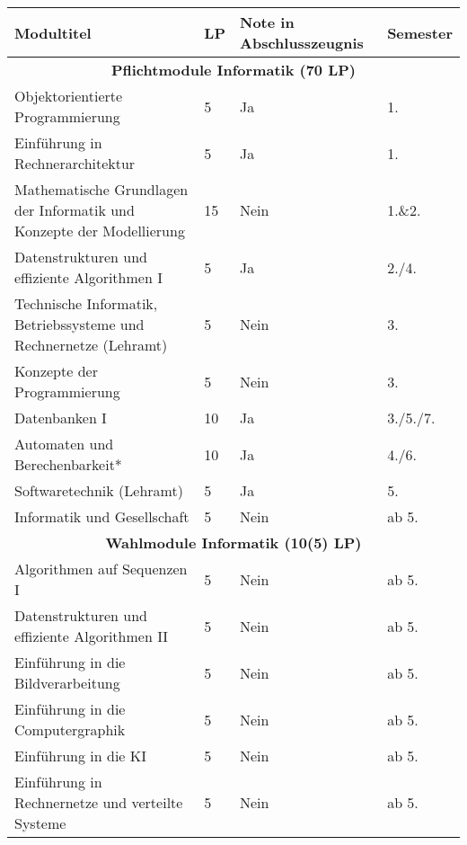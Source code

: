 \begin{table}[tbp]
	\begin{small}
		\begin{tabularx}{\textwidth}{|b{}|X|X|l|}
			\hline
			\textbf{Modultitel}                                                            & \textbf{LP} & \textbf{Note in Abschlusszeugnis} & \textbf{Semester} \\
			\hline
			\multicolumn{4}{|c|}{\textbf{Pflichtmodule Informatik (70 LP)}}\\\hline
			Objektorientierte Programmierung                                      &  5 & Ja   & 1. \\
			Einführung in Rechnerarchitektur                                      &  5 & Ja   & 1. \\
			Mathematische Grundlagen der Informatik und Konzepte der Modellierung & 15 & Nein & 1.\&2. \\
			Datenstrukturen und effiziente Algorithmen I                          &  5 & Ja   & 2./4. \\
			Technische Informatik, Betriebssysteme und Rechnernetze (Lehramt)     &  5 & Nein & 3. \\
			Konzepte der Programmierung                                           &  5 & Nein & 3. \\
			Datenbanken I                                                         & 10 & Ja   & 3./5./7. \\
			Automaten und Berechenbarkeit*                                        & 10 & Ja   & 4./6. \\
			Softwaretechnik (Lehramt)                                             &  5 & Ja   & 5. \\
			Informatik und Gesellschaft                                           &  5 & Nein & ab 5. \\
			\hline
			\multicolumn{4}{|c|}{\textbf{Wahlmodule Informatik (10(5) LP)}}\\\hline
			Algorithmen auf Sequenzen I                      & 5 & Nein & ab 5. \\
			Datenstrukturen und effiziente Algorithmen II    & 5 & Nein & ab 5. \\
			Einführung in die Bildverarbeitung               & 5 & Nein & ab 5. \\
			Einführung in die Computergraphik                & 5 & Nein & ab 5. \\
			Einführung in die KI                             & 5 & Nein & ab 5. \\
			Einführung in Rechnernetze und verteilte Systeme & 5 & Nein & ab 5. \\

\end{tabularx}
\end{small}
\end{table}
